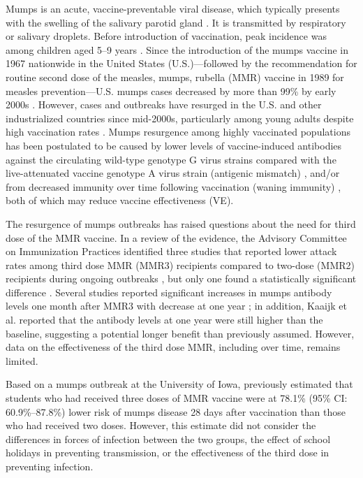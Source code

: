 \documentclass[12pt]{article}
\begin{document}
Mumps is an acute, vaccine-preventable viral disease, which typically presents with the swelling of the salivary parotid gland \citep{hviid2008mumps}.
It is transmitted by respiratory or salivary droplets.
Before introduction of vaccination, peak incidence was among children aged 5–9 years \citep{galazka1999mumps}.
Since the introduction of the mumps vaccine in 1967 nationwide in the United States (U.S.)---followed by the recommendation for routine second dose of the measles, mumps, rubella (MMR) vaccine in 1989 for measles prevention---U.S. mumps cases decreased by more than 99\% by early 2000s \citep{mclean2013prevention}.
However, cases and outbreaks have resurged in the U.S. \citep{ogbuanu2012impact,nelson2013epidemiology,cardemil2017effectiveness,wohl2020combining,lo2021influenza} and other industrialized countries since mid-2000s, particularly among young adults despite high vaccination rates \citep{aasheim2014outbreak,vygen2016waning}.
Mumps resurgence among highly vaccinated populations has been postulated to be caused by lower levels of vaccine-induced antibodies against the circulating wild-type genotype G virus strains compared with the live-attenuated vaccine genotype A virus strain (antigenic mismatch) \citep{peltola2007mumps,rubin2008antibody}, and/or from decreased immunity over time following vaccination (waning immunity) \citep{lewnard2018vaccine,seagle2018measles,gokhale2023disentangling}, both of which may reduce vaccine effectiveness (VE).

The resurgence of mumps outbreaks has raised questions about the need for third dose of the MMR vaccine.
In a review of the evidence, the Advisory Committee on Immunization Practices \citep{marin2018recommendation} identified three studies that reported lower attack rates among third dose MMR (MMR3) recipients compared to two-dose (MMR2) recipients during ongoing outbreaks \citep{ogbuanu2012impact,nelson2013epidemiology,cardemil2017effectiveness}, but only one found a statistically significant difference \citep{cardemil2017effectiveness}. 
Several studies reported significant increases in mumps antibody levels one month after MMR3 with decrease at one year \citep{fiebelkorn2014mumps,latner2017mumps,kaaijk2020third};
in addition, Kaaijk et al. reported that the antibody levels at one year were still higher than the baseline, suggesting a potential longer benefit than previously assumed. 
However, data on the effectiveness of the third dose MMR, including over time, remains limited.

Based on a mumps outbreak at the University of Iowa, \cite{cardemil2017effectiveness} previously estimated that students who had received three doses of MMR vaccine were at 78.1\% (95\% CI: 60.9\%--87.8\%) lower risk of mumps disease 28 days after vaccination than those who had received two doses.
However, this estimate did not consider the differences in forces of infection between the two groups, the effect of school holidays in preventing transmission, or the effectiveness of the third dose in preventing infection. 
\end{document}
